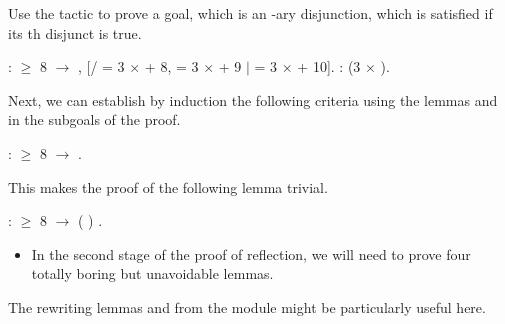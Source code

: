 \begin{exercise}
\begin{itemize}
\end{itemize}


\hint Use the tactic   to prove a goal, which is an
 -ary disjunction, which is satisfied if its th disjunct is
 true.


\begin{coqdoccode}
\coqdocemptyline
\coqdocnoindent
{}   :  \ensuremath{\ge} 8 \ensuremath{\rightarrow} \coqdoceol
\coqdocindent{1.00em}
\coqdoctac{\ensuremath{\exists}} , [/  = 3 \ensuremath{\times}  + 8,  = 3 \ensuremath{\times}  + 9 \ensuremath{|}  = 3 \ensuremath{\times}  + 10].\coqdoceol
\coqdocemptyline
\coqdocnoindent
{}   :  (3 \ensuremath{\times} ).\coqdoceol
\coqdocemptyline
\end{coqdoccode}


\noindent
Next, we can establish by induction the following criteria using the
lemmas  and  in the subgoals of the proof.


\begin{coqdoccode}
\coqdocemptyline
\coqdocnoindent
{}   :  \ensuremath{\ge} 8 \ensuremath{\rightarrow}  .\coqdoceol
\coqdocemptyline
\end{coqdoccode}


\noindent
This makes the proof of the following lemma trivial.


\begin{coqdoccode}
\coqdocemptyline
\coqdocnoindent
{}  :  \ensuremath{\ge} 8 \ensuremath{\rightarrow}  ( ) .\coqdoceol
\coqdocemptyline
\end{coqdoccode}



\begin{itemize}
\item  In the second stage of the proof of reflection, we will
  need to prove four totally boring but unavoidable lemmas.

\end{itemize}


\hint The rewriting lemmas  and  from the 
 module might be particularly useful here.



\end{exercise}
